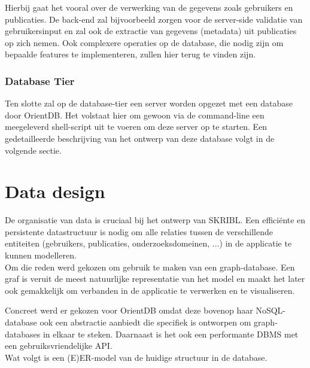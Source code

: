 \documentclass{article}
\begin{document}
Hierbij gaat het vooral over de verwerking van de gegevens zoals gebruikers en publicaties. De back-end zal bijvoorbeeld zorgen voor de server-side validatie van gebruikersinput en zal ook de extractie van gegevens (metadata) uit publicaties op zich nemen. Ook complexere operaties op de database, die nodig zijn om bepaalde features te implementeren, zullen hier terug te vinden zijn.

\subsubsection{Database Tier}

Ten slotte zal op de database-tier een server worden opgezet met een database door OrientDB. Het volstaat hier om gewoon via de command-line een meegeleverd shell-script uit te voeren om deze server op te starten.
Een gedetailleerde beschrijving van het ontwerp van deze database volgt in de volgende sectie. 

\clearpage

\section{Data design}
\label{sec:data}

De organisatie van data is cruciaal bij het ontwerp van SKRIBL. Een effici\"ente en persistente datastructuur is nodig om alle relaties tussen de verschillende entiteiten (gebruikers, publicaties, onderzoeksdomeinen, ...) in de applicatie te kunnen modelleren. \\

Om die reden werd gekozen om gebruik te maken van een graph-database. Een graf is veruit de meest natuurlijke representatie van het model en maakt het later ook gemakkelijk om verbanden in de applicatie te verwerken en te visualiseren. 

Concreet werd er gekozen voor OrientDB omdat deze bovenop haar NoSQL-database ook een abstractie aanbiedt die specifiek is ontworpen om graph-databases in elkaar te steken. Daarnaast is het ook een performante DBMS met een gebruiksvriendelijke API. \\

Wat volgt is een (E)ER-model van de huidige structuur in de database.
\end{document}
